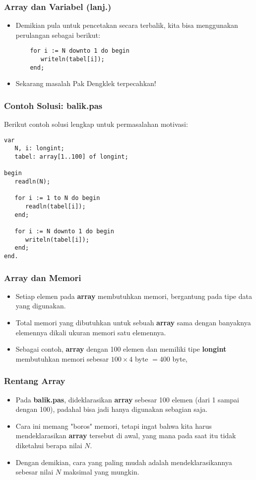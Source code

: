 \documentclass{beamer}
\begin{document}
\begin{frame}[fragile]
\frametitle{Array dan Variabel (lanj.)}
\begin{itemize}
    \item Demikian pula untuk pencetakan secara terbalik, kita bisa menggunakan perulangan sebagai berikut:
    \begin{lstlisting}
    for i := N downto 1 do begin
       writeln(tabel[i]);
    end;
    \end{lstlisting}
    \item Sekarang masalah Pak Dengklek terpecahkan!
\end{itemize}
\end{frame}

\begin{frame}[fragile]
\frametitle{Contoh Solusi: balik.pas}
Berikut contoh solusi lengkap untuk permasalahan motivasi:
\begin{lstlisting}
var
   N, i: longint;
   tabel: array[1..100] of longint;

begin
   readln(N);

   for i := 1 to N do begin
      readln(tabel[i]);
   end;

   for i := N downto 1 do begin
      writeln(tabel[i]);
   end;
end.
\end{lstlisting}
\end{frame}


\begin{frame}
\frametitle{Array dan Memori}
\begin{itemize}
    \item Setiap elemen pada \textbf{array} membutuhkan memori, bergantung pada tipe data yang digunakan.
    \item Total memori yang dibutuhkan untuk sebuah \textbf{array} sama dengan banyaknya elemennya dikali ukuran memori satu elemennya.
    \item Sebagai contoh, \textbf{array} dengan 100 elemen dan memiliki tipe \textbf{longint} membutuhkan memori sebesar $100 \times 4$ byte $= 400$ byte,
\end{itemize}
\end{frame}

\begin{frame}
\frametitle{Rentang Array}
\begin{itemize}
    \item Pada \textbf{balik.pas}, dideklarasikan \textbf{array} sebesar 100 elemen (dari 1 sampai dengan 100), padahal bisa jadi hanya digunakan sebagian saja.
    \item Cara ini memang "boros" memori, tetapi ingat bahwa kita harus mendeklarasikan \textbf{array} tersebut di awal, yang mana pada saat itu tidak diketahui berapa nilai $N$.
    \item Dengan demikian, cara yang paling mudah adalah mendeklarasikannya sebesar nilai $N$ maksimal yang mungkin.
\end{itemize}
\end{frame}
\end{document}
